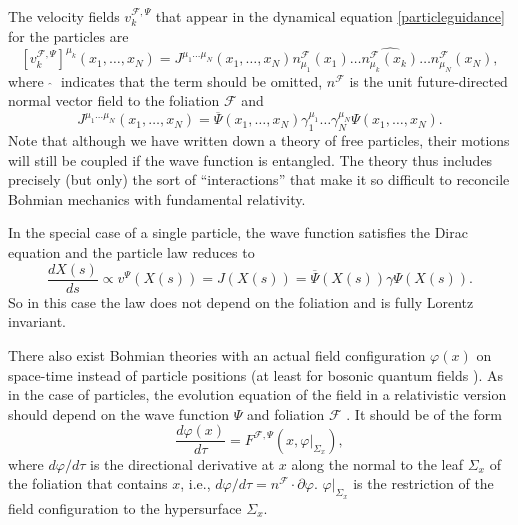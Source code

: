 \documentclass[12pt]{article}
\begin{document}
The velocity fields $v^{\mathscr{F}, \Psi{}}_k$ that appear in the dynamical equation \eqref{particleguidance} for the particles are
\begin{equation}
\left[v^{\mathscr{F}, \Psi{}}_k \right]^{\mu_{k}}(x_1, \ldots, x_N)= J^{\mu_1 \ldots \mu_N} ( x_1, \ldots, x_N)  n^{\mathscr{F}}_{\mu_1}(x_1) \ldots \widehat{n^{\mathscr{F}}_{\mu_k}(x_k)}\ldots   n^{\mathscr{F}}_{\mu_N}(x_N) ,
\label{EQU1}\end{equation}
where $\;\widehat{}\;$ indicates that the term should be omitted, $n^{\mathscr{F}}$ is the unit future-directed normal vector field to the foliation ${\mathscr{F}}$ and 
\begin{equation}  
J^{\mu_1 \ldots \mu_N} (x_1, \dots, x_N) = \overline{\Psi} ( x_1, \ldots, x_N) \gamma_1^{\mu_1} \ldots \gamma_N^{\mu_N} \Psi ( x_1 , \ldots, x_N) .
\label{eqJ}
\end{equation}
Note that although we have written down a theory of
free particles, their motions will still be coupled if the wave
function is entangled.  The theory thus includes precisely (but only)
the sort of ``interactions'' that make it so difficult to reconcile
Bohmian mechanics with fundamental relativity.  

In the special case of a single particle, the wave function satisfies the Dirac equation and the particle law reduces to
\begin{equation}
\frac{d X(s)}{ds} \propto v^\Psi(X(s)) = J(X(s)) = \overline{\Psi} (X(s) ) \gamma \Psi (X(s)) .
\label{eq-1pdiracguidance}
\end{equation}
So in this case the law does not depend on the foliation and is fully Lorentz invariant. 

There also exist Bohmian theories with an actual field configuration $\varphi(x)$ on space-time instead of particle positions (at least for bosonic quantum fields \cite{struyve10}). As in the case of particles, the evolution equation of the field in a relativistic version should depend on the wave function $\Psi$ and foliation $\mathscr{F}$ \cite{duerr90,horton04}. It should be of the form
\begin{equation}
\frac{d \varphi (x)}{d\tau} = F^{\mathscr{F},\Psi}(x,\varphi|_{\Sigma_x}) ,
\label{fieldguidance}
\end{equation}
where $d \varphi /d\tau$ is the directional derivative at $x$ along the normal to the leaf $\Sigma_x$ of the foliation that contains $x$, i.e., $d \varphi /d\tau = n^{\mathscr{F}} \cdot \partial \varphi$. $\varphi|_{\Sigma_x}$ is the restriction of the field configuration to the hypersurface $\Sigma_x$. 
\end{document}
